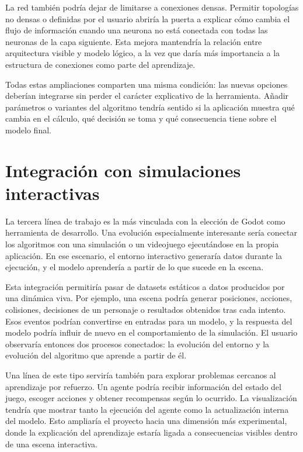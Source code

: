La red también podría dejar de limitarse a conexiones densas. Permitir topologías no densas o definidas por el usuario abriría la puerta a explicar cómo cambia el flujo de información cuando una neurona no está conectada con todas las neuronas de la capa siguiente. Esta mejora mantendría la relación entre arquitectura visible y modelo lógico, a la vez que daría más importancia a la estructura de conexiones como parte del aprendizaje.

Todas estas ampliaciones comparten una misma condición: las nuevas opciones deberían integrarse sin perder el carácter explicativo de la herramienta. Añadir parámetros o variantes del algoritmo tendría sentido si la aplicación muestra qué cambia en el cálculo, qué decisión se toma y qué consecuencia tiene sobre el modelo final.

\section{Integración con simulaciones interactivas}

La tercera línea de trabajo es la más vinculada con la elección de Godot como herramienta de desarrollo. Una evolución especialmente interesante sería conectar los algoritmos con una simulación o un videojuego ejecutándose en la propia aplicación. En ese escenario, el entorno interactivo generaría datos durante la ejecución, y el modelo aprendería a partir de lo que sucede en la escena.

Esta integración permitiría pasar de datasets estáticos a datos producidos por una dinámica viva. Por ejemplo, una escena podría generar posiciones, acciones, colisiones, decisiones de un personaje o resultados obtenidos tras cada intento. Esos eventos podrían convertirse en entradas para un modelo, y la respuesta del modelo podría influir de nuevo en el comportamiento de la simulación. El usuario observaría entonces dos procesos conectados: la evolución del entorno y la evolución del algoritmo que aprende a partir de él.

Una línea de este tipo serviría también para explorar problemas cercanos al aprendizaje por refuerzo. Un agente podría recibir información del estado del juego, escoger acciones y obtener recompensas según lo ocurrido. La visualización tendría que mostrar tanto la ejecución del agente como la actualización interna del modelo. Esto ampliaría el proyecto hacia una dimensión más experimental, donde la explicación del aprendizaje estaría ligada a consecuencias visibles dentro de una escena interactiva.

